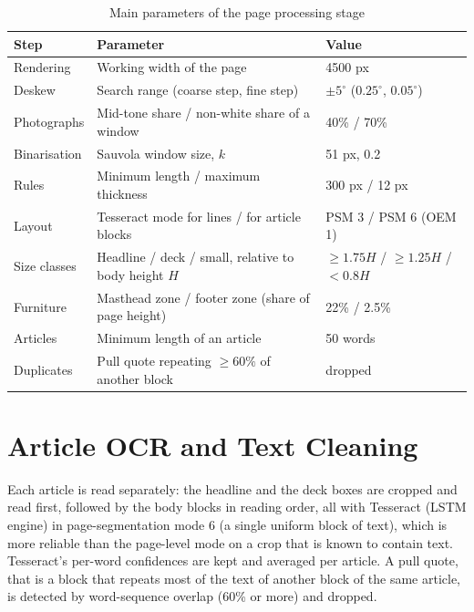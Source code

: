 \begin{table}[t]
\centering
\caption{Main parameters of the page processing stage}
\label{tab:params}
\small
\setlength{\tabcolsep}{5pt}
\begin{tabular}{@{}l p{6.5cm} l@{}}
\toprule
\textbf{Step} & \textbf{Parameter} & \textbf{Value}\\
\midrule
Rendering      & Working width of the page                           & 4500 px\\
Deskew         & Search range (coarse step, fine step)               & $\pm 5^{\circ}$ ($0.25^{\circ}$, $0.05^{\circ}$)\\
Photographs    & Mid-tone share / non-white share of a window        & 40\% / 70\%\\
Binarisation   & Sauvola window size, $k$                            & 51 px, 0.2\\
Rules          & Minimum length / maximum thickness                  & 300 px / 12 px\\
Layout         & Tesseract mode for lines / for article blocks       & PSM 3 / PSM 6 (OEM 1)\\
Size classes   & Headline / deck / small, relative to body height $H$ & $\ge 1.75H$ / $\ge 1.25H$ / $<0.8H$\\
Furniture      & Masthead zone / footer zone (share of page height)  & 22\% / 2.5\%\\
Articles       & Minimum length of an article                        & 50 words\\
Duplicates     & Pull quote repeating $\ge 60\%$ of another block    & dropped\\
\bottomrule
\end{tabular}
\end{table}

\section{Article OCR and Text Cleaning}
\label{sec:ocr}

Each article is read separately: the headline and the deck boxes are cropped and read first, followed by the body blocks in reading order, all with Tesseract (LSTM engine) in page-segmentation mode 6 (a single uniform block of text), which is more reliable than the page-level mode on a crop that is known to contain text. Tesseract's per-word confidences are kept and averaged per article. A pull quote, that is a block that repeats most of the text of another block of the same article, is detected by word-sequence overlap (60\% or more) and dropped.

